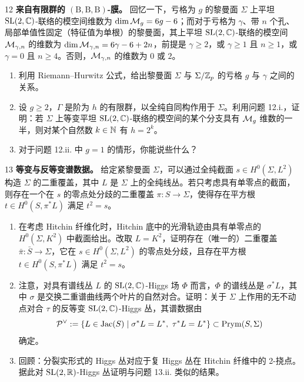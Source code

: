 \begin{prob}{12} \textbf{来自有限群的 $(\mathrm{B},\mathrm{B},\mathrm{B})$-膜。} 回忆一下，亏格为 $g$ 的黎曼面 $\Sigma$ 上平坦 $\mathrm{SL}(2,\mathbb{C})$-联络的模空间维数为 $\dim\mathcal{M}_g = 6g-6$；而对于亏格为 $\gamma$、带 $n$ 个孔、局部单值性固定（特征值为单根）的黎曼面，其上平坦 $\mathrm{SL}(2,\mathbb{C})$-联络的模空间 $\mathcal{M}_{\gamma,n}$ 的维数为 $\dim\mathcal{M}_{\gamma,n} = 6\gamma - 6 + 2n$，前提是 $\gamma \geqslant 2$，或 $\gamma \geqslant 1$ 且 $n \geqslant 1$，或 $\gamma = 0$ 且 $n \geqslant 4$。否则，$\mathcal{M}_{\gamma,n}$ 的维数为 $0$ 或 $2$。
\begin{enumerate}[label=(\roman*),leftmargin=2.2em]
\item 利用 Riemann--Hurwitz 公式，给出黎曼面 $\Sigma$ 与 $\Sigma/\mathbb{Z}_p$ 的亏格 $g$ 与 $\gamma$ 之间的关系。
\item 设 $g \geqslant 2$，$\Gamma$ 是阶为 $h$ 的有限群，以全纯自同构作用于 $\Sigma$。利用问题 12.i.，证明：若 $\Sigma$ 上等变平坦 $\mathrm{SL}(2,\mathbb{C})$-联络的模空间的某个分支具有 $\mathcal{M}_g$ 维数的一半，则对某个自然数 $k \in \mathbb{N}$ 有 $h = 2^k$。
\item 对于问题 12.ii. 中 $g = 1$ 的情形，你能说些什么？
\end{enumerate}
\end{prob}

\begin{prob}{13} \textbf{等变与反等变谱数据。} 给定紧黎曼面 $\Sigma$，可以通过全纯截面 $s \in H^0(\Sigma,L^2)$ 构造 $\Sigma$ 的二重覆盖，其中 $L$ 是 $\Sigma$ 上的全纯线丛。若只考虑具有单零点的截面，则存在一个在 $s$ 的零点处分歧的二重覆盖 $\pi : S \to \Sigma$，使得存在平方根 $t \in H^0(S,\pi^*L)$ 满足 $t^2 = s$。

\begin{enumerate}[label=(\roman*),leftmargin=2.2em]
\item 在考虑 Hitchin 纤维化时，Hitchin 底中的光滑轨迹由具有单零点的 $H^0(\Sigma,K^2)$ 中截面给出。改取 $L = K^2$，证明存在（唯一的）二重覆盖 $\bar\pi : \bar S \to \Sigma$，它在 $s \in H^0(\Sigma,L^2)$ 的零点处分歧，且存在平方根 $t \in H^0(S,\pi^*L)$ 满足 $t^2 = s$。
\item 注意，对具有谱线丛 $L$ 的 $\mathrm{SL}(2,\mathbb{C})$-Higgs 场 $\Phi$ 而言，$\Phi$ 的谱线丛是 $\sigma^*L$，其中 $\sigma$ 是交换二重谱曲线两个叶片的自然对合。证明：关于 $\Sigma$ 上作用的无不动点对合 $\tau$ 的反等变 $\mathrm{SL}(2,\mathbb{C})$-Higgs 丛，其谱数据由
\[
    \mathcal{P}^{\vee} := \{L \in \operatorname{Jac}(S) \mid \sigma^*L = L^*,\ \tau^*L = L^*\} \subset \operatorname{Prym}(S,\Sigma)
\]
确定。
\item 回顾：分裂实形式的 Higgs 丛对应于复 Higgs 丛在 Hitchin 纤维中的 2-挠点。据此对 $\mathrm{SL}(2,\mathbb{R})$-Higgs 丛证明与问题 13.ii. 类似的结果。
\end{enumerate}
\end{prob}

